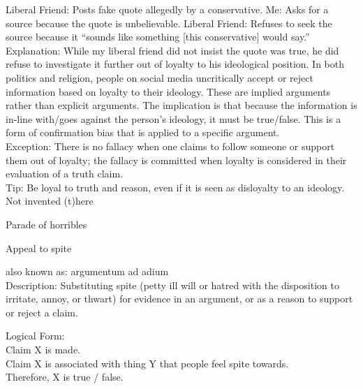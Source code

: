 \documentclass[a4paper,12pt,single,pdftex]{scrartcl}
\begin{document}
      
        Liberal Friend: Posts fake quote allegedly by a conservative. \newline
Me: Asks for a source because the quote is unbelievable. \newline
Liberal Friend: Refuses to seek the source because it “sounds like something [this conservative] would say.”
      \\

      
        Explanation: While my liberal friend did not insist the quote was true, he did refuse to investigate it further out of loyalty to his ideological position. In both politics and religion, people on social media uncritically accept or reject information based on loyalty to their ideology. These are implied arguments rather than explicit arguments. The implication is that because the information is in-line with/goes against the person’s ideology, it must be true/false. This is a form of confirmation bias that is applied to a specific argument.
      \\

      
        Exception: There is no fallacy when one claims to follow someone or support them out of loyalty; the fallacy is committed when loyalty is considered in their evaluation of a truth claim.
      \\

      
        Tip: Be loyal to truth and reason, even if it is seen as disloyalty to an ideology.
      \\

    
  

Not invented (t)here

Parade of horribles

Appeal to spite
    
      also known as: argumentum ad adium
    \\

  
    Description: Substituting spite (petty ill will or hatred with the disposition to irritate, annoy, or thwart) for evidence in an argument, or as a reason to support or reject a claim.

    
      Logical Form:
    \\

    
      Claim X is made.
    \\

    
      Claim X is associated with thing Y that people feel spite towards.
    \\

    
      Therefore, X is true / false.
    \\
\end{document}
